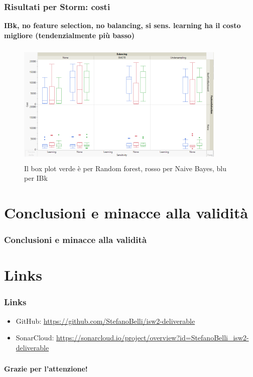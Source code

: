 \documentclass{beamer}
\begin{document}
\begin{frame}
	\frametitle{Risultati per Storm: costi}
	
	\fontsize{7pt}{8pt}\selectfont
	
	\textbf{IBk, no feature selection, no balancing, si sens. learning ha il costo migliore 
	(tendenzialmente più basso)}
	
	\centering
	\begin{figure}
	\includegraphics[width=10cm, height=6cm]{storm-cost}
	\caption{Il box plot verde è per Random forest, rosso per Naive Bayes, blu per IBk}
	\end{figure}
\end{frame}

\section{Conclusioni e minacce alla validità}
\begin{frame}
	\frametitle{Conclusioni e minacce alla validità}
	
\end{frame}

\section{Links}
\begin{frame}
	\frametitle{Links}
	
	\begin{itemize}
		\item GitHub: \url{https://github.com/StefanoBelli/isw2-deliverable}
		\item SonarCloud: \url{https://sonarcloud.io/project/overview?id=StefanoBelli_isw2-deliverable}
	\end{itemize}
	
\end{frame}

\begin{frame}
    \frametitle{}
    
    \fontsize{30pt}{10pt}\selectfont
    \centering
    \textbf{Grazie per l'attenzione!}
    
\end{frame}
\end{document}

